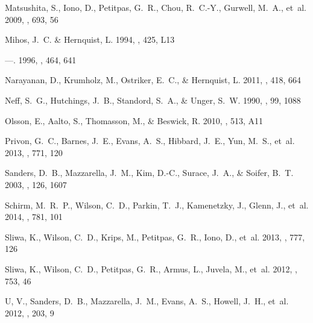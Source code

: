 \begin{thebibliography}{28}
{Matsushita}, S., {Iono}, D., {Petitpas}, G.~R., {Chou}, R.~C.-Y., {Gurwell},
  M.~A., {et~al.} 2009, \apj, 693, 56

{Mihos}, J.~C. \& {Hernquist}, L. 1994, \apjl, 425, L13

---. 1996, \apj, 464, 641

{Narayanan}, D., {Krumholz}, M., {Ostriker}, E.~C., \& {Hernquist}, L. 2011,
  \mnras, 418, 664

{Neff}, S.~G., {Hutchings}, J.~B., {Standord}, S.~A., \& {Unger}, S.~W. 1990,
  \aj, 99, 1088

{Olsson}, E., {Aalto}, S., {Thomasson}, M., \& {Beswick}, R. 2010, \aap, 513,
  A11

{Privon}, G.~C., {Barnes}, J.~E., {Evans}, A.~S., {Hibbard}, J.~E., {Yun},
  M.~S., {et~al.} 2013, \apj, 771, 120

{Sanders}, D.~B., {Mazzarella}, J.~M., {Kim}, D.-C., {Surace}, J.~A., \&
  {Soifer}, B.~T. 2003, \aj, 126, 1607

{Schirm}, M.~R.~P., {Wilson}, C.~D., {Parkin}, T.~J., {Kamenetzky}, J.,
  {Glenn}, J., {et~al.} 2014, \apj, 781, 101

{Sliwa}, K., {Wilson}, C.~D., {Krips}, M., {Petitpas}, G.~R., {Iono}, D.,
  {et~al.} 2013, \apj, 777, 126

{Sliwa}, K., {Wilson}, C.~D., {Petitpas}, G.~R., {Armus}, L., {Juvela}, M.,
  {et~al.} 2012, \apj, 753, 46

{U}, V., {Sanders}, D.~B., {Mazzarella}, J.~M., {Evans}, A.~S., {Howell},
  J.~H., {et~al.} 2012, \apjs, 203, 9


\end{thebibliography}
